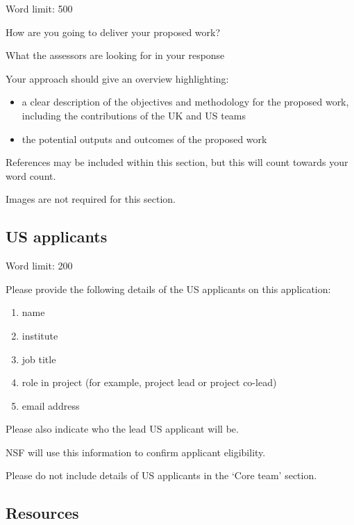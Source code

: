 \documentclass[12in]{article}
\begin{document}
{\color{red}
Word limit: 500

How are you going to deliver your proposed work?

What the assessors are looking for in your response

Your approach should give an overview highlighting:

\begin{itemize}

	\item a clear description of the objectives and methodology for the
proposed work, including the contributions of the UK and US teams

	\item the potential outputs and outcomes of the proposed work

\end{itemize}

References may be included within this section, but this will count towards your
word count.

Images are not required for this section.
}



\pagebreak
\subsection{US applicants}

{\color{red}

Word limit: 200

Please provide the following details of the US applicants on this application:

\begin{enumerate}
	\item name
	\item institute
	\item job title
	\item role in project (for example, project lead or project co-lead)
	\item email address
\end{enumerate}

Please also indicate who the lead US applicant will be.

NSF will use this information to confirm applicant eligibility.

Please do not include details of US applicants in the ‘Core team’ section.

}



\pagebreak
\subsection{Resources}
\end{document}
